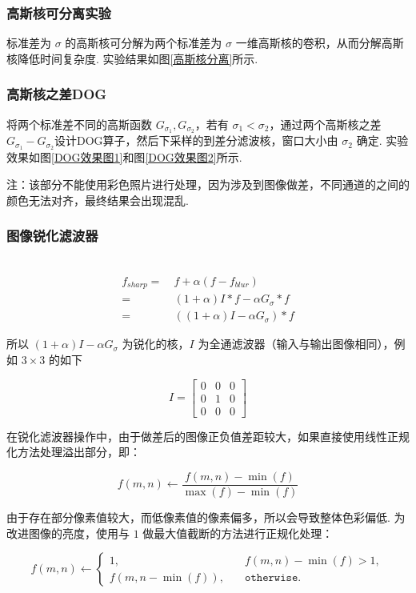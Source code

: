 \documentclass[12pt, a4paper, oneside]{ctexart}
\begin{document}
\subsubsection{高斯核可分离实验}
标准差为 \(\sigma\) 的高斯核可分解为两个标准差为 \(\sigma\)
一维高斯核的卷积，从而分解高斯核降低时间复杂度. 实验结果如图\ref{高斯核分离}所示.
\subsubsection{高斯核之差DOG}
将两个标准差不同的高斯函数 $G_{\sigma_1},G_{\sigma_2}$，若有 $\sigma_1 < \sigma_2$，通过两个高斯核之差$G_{\sigma_1}-G_{\sigma_2}$设计DOG算子，然后下采样的到差分滤波核，窗口大小由 $\sigma_2$ 确定. 实验效果如图\ref{DOG效果图1}和图\ref{DOG效果图2}所示.

注：该部分不能使用彩色照片进行处理，因为涉及到图像做差，不同通道的之间的颜色无法对齐，最终结果会出现混乱.
\subsubsection{图像锐化滤波器}\ \vspace{-1cm}
\begin{align*}
f_{sharp} =&\ f+\alpha(f-f_{blur})\\
=&\ (1+\alpha)I*f-\alpha G_{\sigma}*f\\
=&\ ((1+\alpha)I-\alpha G_\sigma)*f
\end{align*}

所以 \((1+\alpha)I-\alpha G_\sigma\) 为锐化的核，\(I\)
为全通滤波器（输入与输出图像相同），例如 \(3\times 3\) 的如下

\[I = \left[\begin{matrix}0&0&0\\0&1&0\\0&0&0\end{matrix}\right]\]

在锐化滤波器操作中，由于做差后的图像正负值差距较大，如果直接使用线性正规化方法处理溢出部分，即：

\[f(m,n)\leftarrow \frac{f(m,n)-\min(f)}{\max(f)-\min(f)}\]

由于存在部分像素值较大，而低像素值的像素偏多，所以会导致整体色彩偏低.
为改进图像的亮度，使用与 \(1\) 做最大值截断的方法进行正规化处理：

\[f(m,n)\leftarrow \begin{cases}
1,& \quad f(m,n)-\min(f)>1,\\
f(m,n-\min(f)),& \quad\texttt{otherwise}.
\end{cases}\]
\end{document}
